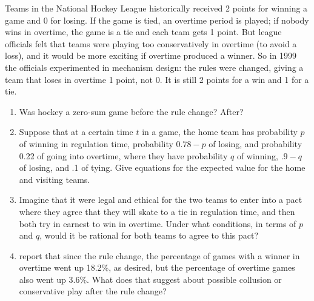 \begin{exercise}
Teams in the National Hockey League historically received 2 points for
winning a game and 0 for losing.  If the game is tied, an overtime
period is played; if nobody wins in overtime, the game is a tie and
each team gets 1 point.  But league officials felt that teams were
playing too conservatively in overtime (to avoid a loss), and it would
be more exciting if overtime produced a winner. So in 1999 the officials
experimented in mechanism design: the rules
were changed, giving a team that loses in overtime 1 point, not 0. It
is still 2 points for a win and 1 for a tie.
\begin{enumerate}
\item Was hockey a zero-sum game before the rule change?  After?
\item Suppose that at a certain time \(t\) in a game, the home team
has probability \(p\) of winning in regulation time, probability
\(0.78-p\) of losing, and probability 0.22 of going into overtime,
where they have probability \(q\) of winning, \(.9-q\) of losing,
and .1 of tying. Give equations for the expected value for the home and visiting
teams.
\item Imagine that it were legal and ethical for the two teams to
enter into a pact where they agree that they will skate to a tie in
regulation time, and then both try in earnest to win in overtime.  Under
what conditions, in terms of \(p\) and \(q\), would it be rational for
both teams to agree to this pact?
\item {} report that since the rule change,
the percentage of games with a winner in overtime went up 18.2\%, as desired,  but
the percentage of overtime games also went up 3.6\%. What does that suggest
about possible collusion or conservative play after the rule change?
\end{enumerate}
\end{exercise} 


